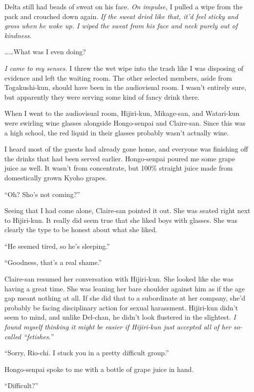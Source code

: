 \documentclass[
    a4paper,
    12pt,
    twoside,
    openany,
    UTF8,
    fontset=windows
]{ctexbook}
\begin{document}
Delta still had beads of sweat on his face. \textit{On impulse,} I pulled a wipe from the pack and crouched down again. \textit{If the sweat dried like that, it'd feel sticky and gross when he woke up. I wiped the sweat from his face and neck purely out of kindness.}

\dots\dots What was I even doing?

\textit{I came to my senses.} I threw the wet wipe into the trash like I was disposing of evidence and left the waiting room. The other selected members, aside from Togakushi-kun, should have been in the audiovisual room. I wasn't entirely sure, but apparently they were serving some kind of fancy drink there.

When I went to the audiovisual room, Hijiri-kun, Mikage-san, and Watari-kun were swirling wine glasses alongside Hongo-senpai and Claire-san. Since this was a high school, the red liquid in their glasses probably wasn't actually wine.

I heard most of the guests had already gone home, and everyone was finishing off the drinks that had been served earlier. Hongo-senpai poured me some grape juice as well. It wasn't from concentrate, but 100\% straight juice made from domestically grown Kyoho grapes.

``Oh? Sho's not coming?''

Seeing that I had come alone, Claire-san pointed it out. She was seated right next to Hijiri-kun. It really did seem true that she liked boys with glasses. She was clearly the type to be honest about what she liked.

``He seemed tired, so he's sleeping.''

``Goodness, that's a real shame.''

Claire-san resumed her conversation with Hijiri-kun. She looked like she was having a great time. She was leaning her bare shoulder against him as if the age gap meant nothing at all. If she did that to a subordinate at her company, she'd probably be facing disciplinary action for sexual harassment. Hijiri-kun didn't seem to mind, and unlike Del-chan, he didn't look flustered in the slightest. \textit{I found myself thinking it might be easier if Hijiri-kun just accepted all of her so-called ``fetishes.''}

``Sorry, Rio-chi. I stuck you in a pretty difficult group.''

Hongo-senpai spoke to me with a bottle of grape juice in hand.

``Difficult?''
\end{document}
